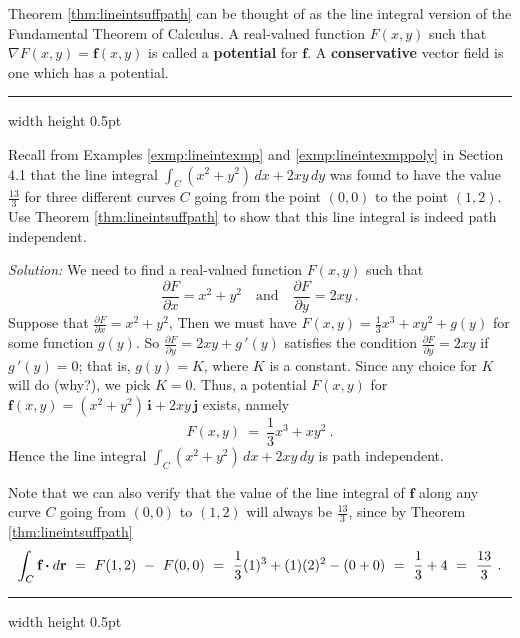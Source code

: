 Theorem \ref{thm:lineintsuffpath} can be thought of as the line integral version of the Fundamental Theorem of
Calculus. A real-valued function $F(x,y)$ such that $\nabla F(x,y) = \mathbf{f}(x,y)$ is called a \textbf{potential} for $\mathbf{f}$. 
A \textbf{conservative} vector field is one which has a potential.

\medskip
\hrule width \textwidth height 0.5pt
\begin{exmp}\label{exmp:lineintexmpclosed}
 Recall from Examples \ref{exmp:lineintexmp}  and \ref{exmp:lineintexmppoly} in Section 4.1 that the line
 integral $\int_C (x^2 + y^2 )\,dx + 2xy\,dy$ was found to have the value $\frac{13}{3}$ for three different curves $C$
 going from the point $(0,0)$ to the point $(1,2)$. Use Theorem \ref{thm:lineintsuffpath} to show that this line
 integral is indeed path independent.\smallskip
 \par\noindent \emph{Solution:} We need to find a real-valued function $F(x,y)$ such that
 \begin{displaymath}
  \frac{\partial F}{\partial x} = x^2 + y^2 \quad\text{and}\quad \frac{\partial F}{\partial y} =  2xy ~.
 \end{displaymath}
Suppose that $\frac{\partial F}{\partial x} = x^2 + y^2$, Then we must have $F(x,y) = \frac{1}{3}x^3 + xy^2 + g(y)$ for some function $g(y)$. So $\frac{\partial F}{\partial y} = 2xy + g\,'(y)$ satisfies the condition $\frac{\partial F}{\partial y} = 2xy$ if $g\,'(y)=0$;
that is, $g(y)=K$, where $K$ is a constant. 
Since any choice for $K$ will do (why?), we pick $K=0$. Thus, a potential $F(x,y)$ for 
 $\mathbf{f}(x,y) = ( x^2 + y^2 )\,\mathbf{i} + 2xy\,\mathbf{j}$ exists, namely
 \begin{displaymath}
  F(x,y) ~=~ \frac{1}{3}x^3 + xy^2 ~.
 \end{displaymath}
 Hence the line integral $\int_C (x^2 + y^2 )\,dx + 2xy\,dy$ is path independent.
 
 \par\noindent Note that we can also verify that the value of the line integral of $\mathbf{f}$ along any curve $C$ going
 from $(0,0)$ to $(1,2)$ will always be $\frac{13}{3}$, since by Theorem \ref{thm:lineintsuffpath}
 \begin{displaymath}
  \int_{C} \textbf{f} \bm{\cdot} d\textbf{r} ~=~ F(1,2) ~-~ F(0,0) ~=~ \frac{1}{3}(1)^3 + (1)(2)^2 - (0+0) ~=~ \frac{1}{3} + 4 ~=~ \frac{13}{3} ~.
 \end{displaymath}
\end{exmp}
\hrule width \textwidth height 0.5pt
\medskip

